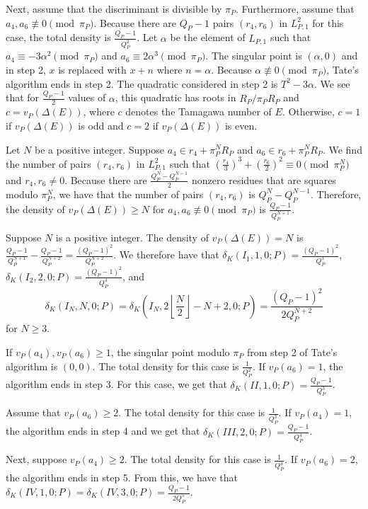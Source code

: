 \documentclass[12pt,letterpaper]{amsart}
\theoremstyle{definition}
\begin{document}
Next, assume that the discriminant is divisible by $\pi_P$. Furthermore, assume that $a_4,a_6\not\equiv 0\pmod{\pi_P}$. Because there are $Q_P-1$ pairs $(r_4, r_6)$ in $L_{P,1}^2$ for this case, the total density is $\frac{Q_P-1}{Q_P^2}$. Let $\alpha$ be the element of $L_{P,1}$ such that $a_4\equiv -3\alpha^2\pmod{\pi_P}$ and $a_6\equiv 2\alpha^3\pmod{\pi_P}$. The singular point is $(\alpha, 0)$ and in step 2, $x$ is replaced with $x+n$ where $n=\alpha$. Because $\alpha\not\equiv 0\pmod{\pi_P}$, Tate's algorithm ends in step 2. The quadratic considered in step 2 is $T^2-3\alpha$. We see that for $\frac{Q_P-1}{2}$ values of $\alpha$, this quadratic has roots in $R_P/\pi_P R_P$ and $c=v_P(\Delta(E))$, where $c$ denotes the Tamagawa number of $E$. Otherwise, $c=1$ if $v_P(\Delta(E))$ is odd and $c=2$ if $v_P(\Delta(E))$ is even.

Let $N$ be a positive integer. Suppose $a_4\in r_4+\pi_P^NR_P$ and $a_6\in r_6+\pi_P^NR_P$. We find the number of pairs $(r_4, r_6)$ in $L_{P,1}^2$ such that $\left(\frac{r_4}{3}\right)^3+\left(\frac{r_6}{2}\right)^2\equiv 0\pmod{\pi_P^N}$ and $r_4, r_6\not=0$. Because there are $\frac{Q_P^N-Q_P^{N-1}}{2}$ nonzero residues that are squares modulo $\pi_P^N$, we have that the number of pairs $(r_4, r_6)$ is $Q_P^N-Q_P^{N-1}$. Therefore, the density of $v_P(\Delta(E))\geq N$ for $a_4, a_6\not\equiv 0\pmod{\pi_P}$ is $\frac{Q_P-1}{Q_P^{N+1}}$. 

Suppose $N$ is a positive integer. The density of $v_P(\Delta(E))=N$ is $\frac{Q_P-1}{Q_P^{N+1}}-\frac{Q_P-1}{Q_P^{N+2}}=\frac{(Q_P-1)^2}{Q_P^{N+2}}$. We therefore have that $\delta_K(I_1, 1, 0; P)=\frac{(Q_P-1)^2}{Q_P^3}$, $\delta_K(I_2, 2, 0; P)=\frac{(Q_P-1)^2}{Q_P^4}$, and 
\[
\delta_K(I_N, N, 0;P)=\delta_K\left(I_N,2\left\lfloor\frac{N}{2}\right\rfloor-N+2,0;P\right)=\frac{(Q_P-1)^2}{2Q_P^{N+2}}
\]
for $N\geq 3$. 

If $v_P(a_4), v_P(a_6)\geq 1$, the singular point modulo $\pi_P$ from step 2 of Tate's algorithm is $(0,0)$. The total density for this case is $\frac{1}{Q_P^2}$. If $v_P(a_6)=1$, the algorithm ends in step 3. For this case, we get that $\delta_K(II, 1, 0;P)=\frac{Q_P-1}{Q_P^3}$.

Assume that $v_P(a_6)\geq 2$. The total density for this case is $\frac{1}{Q_P^3}$. If $v_P(a_4)=1$, the algorithm ends in step 4 and we get that $\delta_K(III, 2,0;P)=\frac{Q_P-1}{Q_P^4}$.

Next, suppose $v_P(a_4)\geq 2$. The total density for this case is $\frac{1}{Q_P^4}$. If $v_P(a_6)=2$, the algorithm ends in step 5. From this, we have that $\delta_K(IV,1,0;P)=\delta_K(IV,3,0;P)=\frac{Q_P-1}{2Q_P^5}$.
\end{document}
